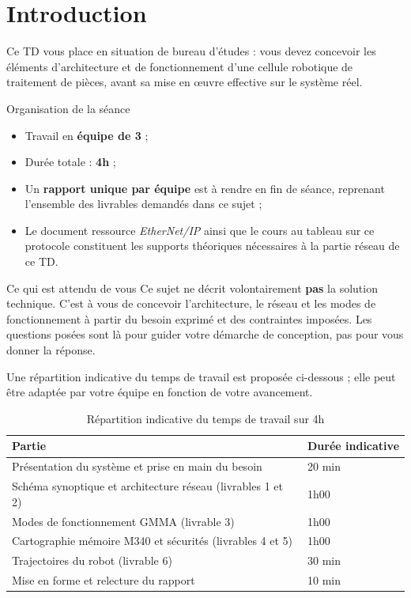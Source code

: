 \section{Introduction}

Ce TD vous place en situation de bureau d'études : vous devez concevoir les
éléments d'architecture et de fonctionnement d'une cellule robotique de
traitement de pièces, avant sa mise en œuvre effective sur le système réel.

\begin{UPSTIinfor}{Organisation de la séance}
\begin{itemize}
    \item Travail en \textbf{équipe de 3} ;
    \item Durée totale : \textbf{4h} ;
    \item Un \textbf{rapport unique par équipe} est à rendre en fin de séance,
    reprenant l'ensemble des livrables demandés dans ce sujet ;
    \item Le document ressource \emph{EtherNet/IP} ainsi que le cours au tableau
    sur ce protocole constituent les supports théoriques nécessaires à la
    partie réseau de ce TD.
\end{itemize}
\end{UPSTIinfor}

\begin{UPSTIwarning}{Ce qui est attendu de vous}
Ce sujet ne décrit volontairement \textbf{pas} la solution technique. C'est à
vous de concevoir l'architecture, le réseau et les modes de fonctionnement à
partir du besoin exprimé et des contraintes imposées. Les questions posées
sont là pour guider votre démarche de conception, pas pour vous donner la
réponse.
\end{UPSTIwarning}

Une répartition indicative du temps de travail est proposée ci-dessous ; elle
peut être adaptée par votre équipe en fonction de votre avancement.

\begin{table}[h!]
    \centering
    \begin{tabular}{|l|l|}
        \hline
        \textbf{Partie} & \textbf{Durée indicative} \\
        \hline
        Présentation du système et prise en main du besoin & 20 min \\
        \hline
        Schéma synoptique et architecture réseau (livrables 1 et 2) & 1h00 \\
        \hline
        Modes de fonctionnement GMMA (livrable 3) & 1h00 \\
        \hline
        Cartographie mémoire M340 et sécurités (livrables 4 et 5) & 1h00 \\
        \hline
        Trajectoires du robot (livrable 6) & 30 min \\
        \hline
        Mise en forme et relecture du rapport & 10 min \\
        \hline
    \end{tabular}
    \caption{Répartition indicative du temps de travail sur 4h}
\end{table}
